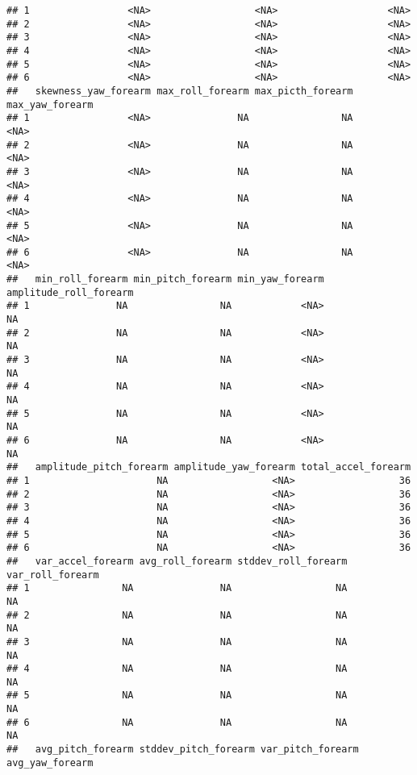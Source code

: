 \documentclass[
]{article}
\begin{document}
\begin{verbatim}
## 1                 <NA>                  <NA>                   <NA>
## 2                 <NA>                  <NA>                   <NA>
## 3                 <NA>                  <NA>                   <NA>
## 4                 <NA>                  <NA>                   <NA>
## 5                 <NA>                  <NA>                   <NA>
## 6                 <NA>                  <NA>                   <NA>
##   skewness_yaw_forearm max_roll_forearm max_picth_forearm max_yaw_forearm
## 1                 <NA>               NA                NA            <NA>
## 2                 <NA>               NA                NA            <NA>
## 3                 <NA>               NA                NA            <NA>
## 4                 <NA>               NA                NA            <NA>
## 5                 <NA>               NA                NA            <NA>
## 6                 <NA>               NA                NA            <NA>
##   min_roll_forearm min_pitch_forearm min_yaw_forearm amplitude_roll_forearm
## 1               NA                NA            <NA>                     NA
## 2               NA                NA            <NA>                     NA
## 3               NA                NA            <NA>                     NA
## 4               NA                NA            <NA>                     NA
## 5               NA                NA            <NA>                     NA
## 6               NA                NA            <NA>                     NA
##   amplitude_pitch_forearm amplitude_yaw_forearm total_accel_forearm
## 1                      NA                  <NA>                  36
## 2                      NA                  <NA>                  36
## 3                      NA                  <NA>                  36
## 4                      NA                  <NA>                  36
## 5                      NA                  <NA>                  36
## 6                      NA                  <NA>                  36
##   var_accel_forearm avg_roll_forearm stddev_roll_forearm var_roll_forearm
## 1                NA               NA                  NA               NA
## 2                NA               NA                  NA               NA
## 3                NA               NA                  NA               NA
## 4                NA               NA                  NA               NA
## 5                NA               NA                  NA               NA
## 6                NA               NA                  NA               NA
##   avg_pitch_forearm stddev_pitch_forearm var_pitch_forearm avg_yaw_forearm

\end{verbatim}
\end{document}

